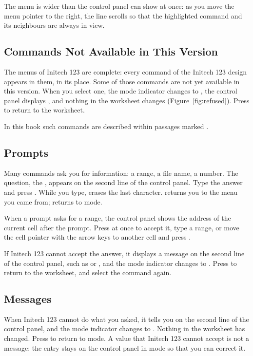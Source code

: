 The menu is wider than the control panel can show at once: as you move
the menu pointer to the right, the line scrolls so that the highlighted
command and its neighbours are always in view.

\subsection{Commands Not Available in This Version}
The menus of Initech 123 are complete: every command of the Initech 123
design appears in them, in its place.  Some of those commands are not yet
available in this version.  When you select one, the mode indicator changes
to , the control panel displays ,
and nothing in the worksheet changes (Figure~\ref{fig:refused}).  Press
 to return to the worksheet.


In this book such commands are described within passages marked \DraftSample.

\subsection{Prompts}
Many commands ask you for information: a range, a file name, a number.  The
question, the , appears on the second line of the control
panel.  Type the answer and press .  While you type,
 erases the last character.   returns you to
the menu you came from;  returns to  mode.

When a prompt asks for a range, the control panel shows the address of the
current cell after the prompt.  Press  at once to accept it,
type a range, or move the cell pointer with the arrow keys to another cell
and press .

If Initech 123 cannot accept the answer, it displays a message on the
second line of the control panel, such as  or
, and the mode indicator changes to .
Press  to return to the worksheet, and select the command again.

\subsection{Messages}
When Initech 123 cannot do what you asked, it tells you on the second line
of the control panel, and the mode indicator changes to .
Nothing in the worksheet has changed.  Press  to return to
 mode.  A value that Initech 123 cannot accept is not a
message: the entry stays on the control panel in  mode so that
you can correct it.

